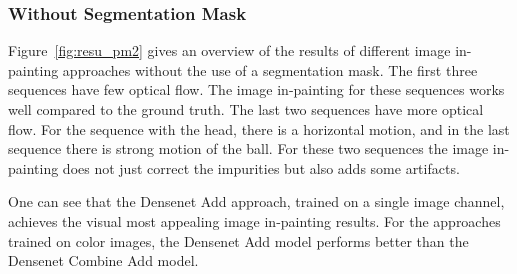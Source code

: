 \subsubsection{Without Segmentation Mask}
\label{sssec:num542}

Figure~\ref{fig:resu_pm2} gives an overview of the results of different image in-painting approaches without the use of a segmentation mask. The first three sequences have few optical flow. The image in-painting for these sequences works well compared to the ground truth. The last two sequences have more optical flow. For the sequence with the head, there is a horizontal motion, and in the last sequence there is strong motion of the ball. For these two sequences the image in-painting does not just correct the impurities but also adds some artifacts.

One can see that the Densenet Add approach, trained on a single image channel, achieves the visual most appealing image in-painting results. For the approaches trained on color images, the Densenet Add model performs better than the Densenet Combine Add model.

